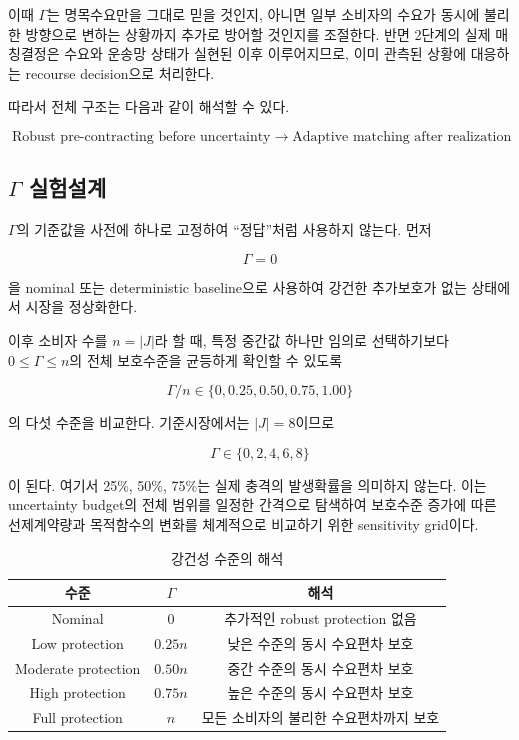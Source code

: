 \documentclass[11pt,a4paper]{article}
\begin{document}
이때 $\Gamma$는 명목수요만을 그대로 믿을 것인지,
아니면 일부 소비자의 수요가 동시에 불리한 방향으로 변하는 상황까지
추가로 방어할 것인지를 조절한다.
반면 2단계의 실제 매칭결정은 수요와 운송망 상태가 실현된 이후 이루어지므로,
이미 관측된 상황에 대응하는 recourse decision으로 처리한다.

따라서 전체 구조는 다음과 같이 해석할 수 있다.

\[
\boxed{
\text{Robust pre-contracting before uncertainty}
\;\longrightarrow\;
\text{Adaptive matching after realization}
}
\]

\subsection{$\Gamma$ 실험설계}

$\Gamma$의 기준값을 사전에 하나로 고정하여 ``정답''처럼 사용하지 않는다.
먼저

\[
\Gamma=0
\]

을 nominal 또는 deterministic baseline으로 사용하여
강건한 추가보호가 없는 상태에서 시장을 정상화한다.

이후 소비자 수를 $n=|J|$라 할 때, 특정 중간값 하나만 임의로 선택하기보다
$0\leq\Gamma\leq n$의 전체 보호수준을 균등하게 확인할 수 있도록

\[
\boxed{
\Gamma/n\in\{0,0.25,0.50,0.75,1.00\}
}
\]

의 다섯 수준을 비교한다.
기준시장에서는 $|J|=8$이므로

\[
\boxed{\Gamma\in\{0,2,4,6,8\}}
\]

이 된다. 여기서 25\%, 50\%, 75\%는 실제 충격의 발생확률을 의미하지 않는다.
이는 uncertainty budget의 전체 범위를 일정한 간격으로 탐색하여
보호수준 증가에 따른 선제계약량과 목적함수의 변화를 체계적으로 비교하기 위한 sensitivity grid이다.

\begin{table}[h!]
\centering
\caption{강건성 수준의 해석}
\begin{tabular}{ccc}
\toprule
\textbf{수준} & \textbf{$\Gamma$} & \textbf{해석} \\
\midrule
Nominal & $0$ & 추가적인 robust protection 없음 \\
Low protection & $0.25n$ & 낮은 수준의 동시 수요편차 보호 \\
Moderate protection & $0.50n$ & 중간 수준의 동시 수요편차 보호 \\
High protection & $0.75n$ & 높은 수준의 동시 수요편차 보호 \\
Full protection & $n$ & 모든 소비자의 불리한 수요편차까지 보호 \\
\bottomrule
\end{tabular}
\end{table}
\end{document}
